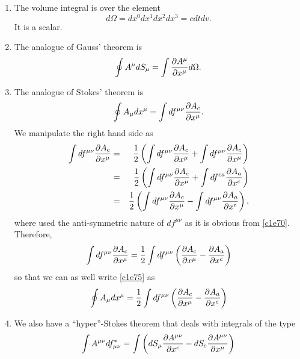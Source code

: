 \begin{enumerate}
\begin{enumerate}
\item The volume integral is over the element
\begin{equation}\label{c1e73}
d\Omega = dx^0 dx^1 dx^2 dx^3 = cdtdv.
\end{equation}
It is a scalar.

\item The analogue of Gauss' theorem is
\begin{equation}\label{c1e74}
\oint A^\mu dS_\mu = \int \frac{\partial{A^\mu}}{\partial{x^\mu}}d\Omega.
\end{equation}

\item The analogue of Stokes' theorem is
\begin{equation}\label{c1e75}
\oint A_\mu dx^\mu = \int df^{\mu\nu}\frac{\partial{A_{c}}}{\partial{x^\mu}}.
\end{equation}
We manipulate the right hand side as
\begin{eqnarray*}
\int df^{\mu\nu}\frac{\partial{A_{c}}}{\partial{x^\mu}} &=& 
 \frac{1}{2}\left(\int df^{\mu\nu}\frac{\partial{A_{c}}}{\partial{x^\mu}} +
 \int df^{\mu\nu}\frac{\partial{A_{c}}}{\partial{x^\mu}}\right) \\
&=& \frac{1}{2}\left(\int df^{\mu\nu}\frac{\partial{A_{c}}}{\partial{x^\mu}} + 
    \int df^{c a}\frac{\partial{A_{a}}}{\partial{x^c}}\right) \\
&=& \frac{1}{2}\left(\int df^{\mu\nu}\frac{\partial{A_{c}}}{\partial{x^\mu}} - 
    \int df^{\mu\nu}\frac{\partial{A_{a}}}{\partial{x^c}}\right),
\end{eqnarray*}
where used the anti-symmetric nature of $df^{\mu\nu}$ as it is obvious from 
\eqref{c1e70}. Therefore,
\[
\int df^{\mu\nu}\frac{\partial{A_{c}}}{\partial{x^\mu}} = 
\frac{1}{2}\int df^{\mu\nu}\left(\frac{\partial{A_{c}}}{\partial{x^\mu}} - \frac{\partial{A_{a}}}{\partial{x^c}}\right)
\]
so that we can as well write \eqref{c1e75} as
\begin{equation}\label{c1e76}
\oint A_\mu dx^\mu = \frac{1}{2}\int df^{\mu\nu}
\left(\frac{\partial{A_{c}}}{\partial{x^\mu}} - \frac{\partial{A_{a}}}{\partial{x^c}}\right)
\end{equation}

\item We also have a ``hyper''-Stokes theorem that deals with integrals of the 
type
\begin{equation}\label{c1e77}
\int A^{\mu\nu}df^\ast_{\mu\nu} = 
\int\left(dS_\mu\frac{\partial{A^{\mu\nu}}}{\partial{x^c}} - dS_c\frac{\partial{A^{\mu\nu}}}{\partial{x^\mu}}\right)
\end{equation}
\end{enumerate}


\end{enumerate}
